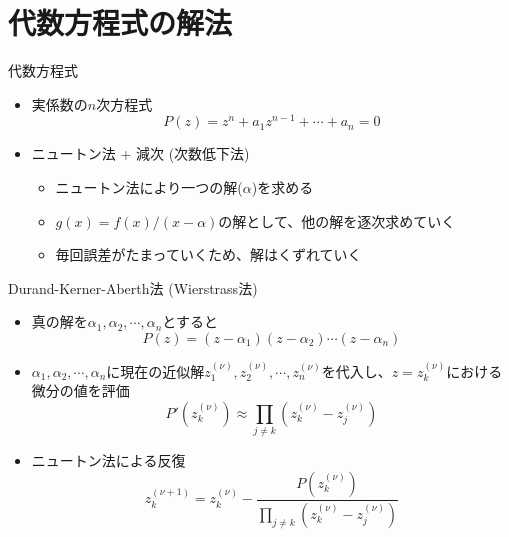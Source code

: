 \section{代数方程式の解法}

\begin{frame}[t,fragile]{代数方程式}
  \begin{itemize}
    \setlength{\itemsep}{1em}
  \item 実係数の$n$次方程式
    \[
    P(z) = z^n + a_1 z^{n-1} + \cdots + a_n = 0
    \]
  \item ニュートン法 + 減次 (次数低下法)
    \begin{itemize}
    \item ニュートン法により一つの解($\alpha$)を求める
    \item $g(x) = f(x) / (x-\alpha)$の解として、他の解を逐次求めていく
    \item 毎回誤差がたまっていくため、解はくずれていく
    \end{itemize}
  \end{itemize}
\end{frame}


\begin{frame}[t,fragile]{Durand-Kerner-Aberth法 (Wierstrass法)}
  \begin{itemize}
    \setlength{\itemsep}{1em}
  \item 真の解を$\alpha_1,\alpha_2,\cdots,\alpha_n$とすると
    \[
    P(z) = (z-\alpha_1) (z-\alpha_2) \cdots (z-\alpha_n)
    \]
  \item $\alpha_1,\alpha_2,\cdots,\alpha_n$に現在の近似解$z^{(\nu)}_1,z^{(\nu)}_2,\cdots,z^{(\nu)}_n$を代入し、$z=z^{(\nu)}_k$における微分の値を評価
    \[
    P'(z^{(\nu)}_k) \approx \prod_{j \ne k} (z^{(\nu)}_k - z^{(\nu)}_j)
    \]
  \item ニュートン法による反復
    \[
    z^{(\nu+1)}_k = z^{(\nu)}_k - \frac{P(z^{(\nu)}_k)}{\prod_{j \ne k} (z^{(\nu)}_k - z^{(\nu)}_j)}
    \]
  \end{itemize}
\end{frame}

